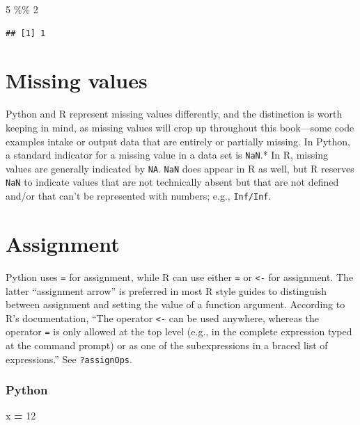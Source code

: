 \documentclass[
]{book}
\newenvironment{Shaded}{\begin{snugshade}}{\end{snugshade}}
\newcommand{\DecValTok}[1]{\textcolor[rgb]{0.00,0.00,0.81}{#1}}
\newcommand{\NormalTok}[1]{#1}
\newcommand{\OperatorTok}[1]{\textcolor[rgb]{0.81,0.36,0.00}{\textbf{#1}}}
\newcommand{\SpecialCharTok}[1]{\textcolor[rgb]{0.00,0.00,0.00}{#1}}
\begin{document}
\begin{Shaded}
\begin{Highlighting}[]
\DecValTok{5} \SpecialCharTok{\%\%} \DecValTok{2}
\end{Highlighting}
\end{Shaded}

\begin{verbatim}
## [1] 1
\end{verbatim}

\hypertarget{missing-values}{%
\section{Missing values}\label{missing-values}}

Python and R represent missing values differently, and the distinction is worth keeping in mind, as missing values will crop up throughout this book---some code examples intake or output data that are entirely or partially missing. In Python, a standard indicator for a missing value in a data set is \texttt{NaN}.* In R, missing values are generally indicated by \texttt{NA}. \texttt{NaN} does appear in R as well, but R reserves \texttt{NaN} to indicate values that are not technically absent but that are not defined and/or that can't be represented with numbers; e.g., \texttt{Inf/Inf}.

\hypertarget{assignment}{%
\section{Assignment}\label{assignment}}

Python uses \texttt{=} for assignment, while R can use either \texttt{=} or \texttt{\textless{}-} for assignment. The latter ``assignment arrow'' is preferred in most R style guides to distinguish between assignment and setting the value of a function argument. According to R's documentation, ``The operator \texttt{\textless{}-} can be used anywhere, whereas the operator \texttt{=} is only allowed at the top level (e.g., in the complete expression typed at the command prompt) or as one of the subexpressions in a braced list of expressions.'' See \texttt{?assignOps}.

\hypertarget{python-1}{%
\subsubsection*{Python}\label{python-1}}

\begin{Shaded}
\begin{Highlighting}[]
\NormalTok{x }\OperatorTok{=} \DecValTok{12}
\end{Highlighting}
\end{Shaded}
\end{document}
